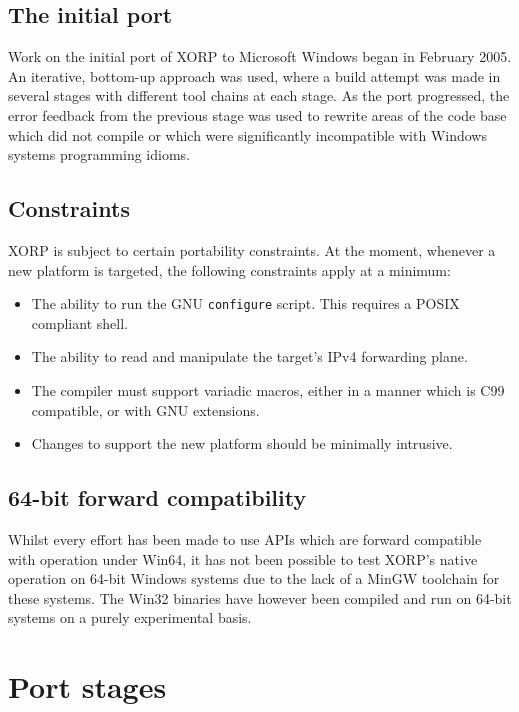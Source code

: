 \documentclass[11pt]{article}
\begin{document}
\subsection{The initial port}

Work on the initial port of XORP to Microsoft Windows began
in February 2005. An iterative, bottom-up approach was used, where a build attempt
was made in several stages with different tool chains at each stage. As the
port progressed, the error feedback from the previous stage was used to rewrite
areas of the code base which did not compile or which were significantly
incompatible with Windows systems programming idioms.

\subsection{Constraints}

XORP is subject to certain portability constraints. At the moment,
whenever a new platform is targeted, the following constraints apply at a minimum:
\begin{itemize}
 \item The ability to run the GNU {\tt configure} script.
       This requires a POSIX compliant shell.
 \item The ability to read and manipulate the target's IPv4 forwarding plane.
 \item The compiler must support variadic macros, either in a manner which is
C99 compatible, or with GNU extensions.
 \item Changes to support the new platform should be minimally intrusive.
\end{itemize}


\subsection{64-bit forward compatibility}

Whilst every effort has been made to use APIs which are forward compatible
with operation under Win64, it has not been possible to test XORP's
native operation on 64-bit Windows systems due to the lack of a MinGW
toolchain for these systems. The Win32 binaries have however been
compiled and run on 64-bit systems on a purely experimental basis.

\section{Port stages}
\end{document}
